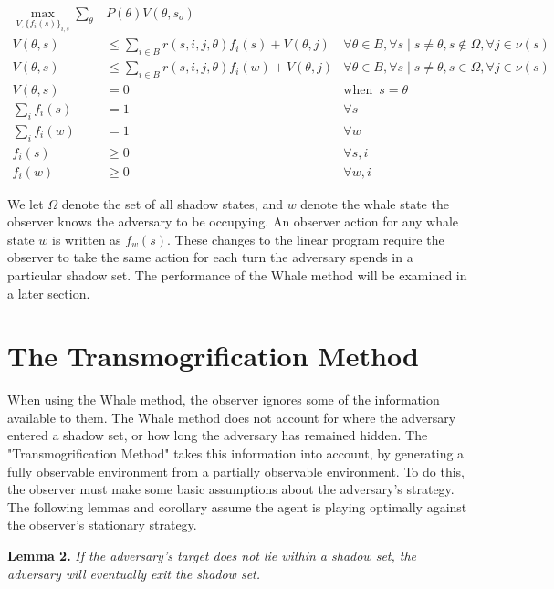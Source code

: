\begin{align}
\!\!\!\!\max_{V, \{f_i(s)\}_{i,s}} \sum_{\theta}&P(\theta)V(\theta, s_{o}) \label{eq:game_obj}\\
V(\theta, s) &\leq \sum_{i \in B} r(s, i, j, \theta)f_{i}(s) + V(\theta, j) &\forall\theta\in B,\forall s \mid s\neq \theta,s\not\in \Omega, \forall j\in\nu(s)\label{eq:game_incentive}\\
V(\theta, s) &\leq \sum_{i \in B} r(s, i, j, \theta)f_{i}(w) + V(\theta, j) &\forall\theta\in B,\forall s \mid s\neq \theta,s\in \Omega, \forall j\in\nu(s)\label{eq:game_incentive}\\
V(\theta, s) &= 0 \quad &\mbox{when} \,\,\, s=\theta\label{eq:game_end}\\
\sum_{i} f_{i}(s) &= 1\quad &\forall s \label{eq:game_sum}\\
\sum_{i} f_{i}(w) &= 1\quad &\forall w \label{eq:game_sum}\\
f_{i}(s) &\geq 0\quad &\forall s,i\label{eq:game_nonneg}\\
f_{i}(w) &\geq 0\quad &\forall w,i\label{eq:game_nonneg}
\end{align}

We let $\Omega$ denote the set of all shadow states, and $w$ denote the whale state the observer knows the adversary to be occupying. An observer action for any whale state $w$ is written as $f_{w}(s)$. These changes to the linear program require the observer to take the same action for each turn the adversary spends in a particular shadow set. The performance of the Whale method will be examined in a later section. 

\section{The Transmogrification Method}

When using the Whale method, the observer ignores some of the information available to them. The Whale method does not account for where the adversary entered a shadow set, or how long the adversary has remained hidden. The "Transmogrification Method" takes this information into account, by generating a fully observable environment from a partially observable environment. To do this, the observer must make some basic assumptions about the adversary's strategy. The following lemmas and corollary assume the agent is playing optimally against the observer's stationary strategy. 

\textbf{Lemma 2.} \textit{If the adversary's target does not lie within a shadow set, the adversary will eventually exit the shadow set.}

